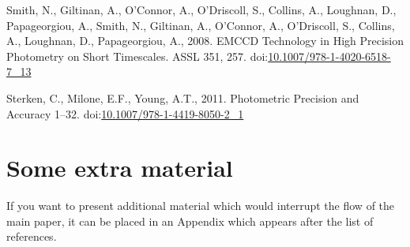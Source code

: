 \documentclass[]{elsarticle} %
\newlength{\cslhangindent}
\newlength{\cslentryspacingunit} %
\newenvironment{CSLReferences}[2] %
 {%
  \setlength{\parindent}{0pt}
  \ifodd #1
  \let\oldpar\par
  \def\par{\hangindent=\cslhangindent\oldpar}
  \fi
  \setlength{\parskip}{#2\cslentryspacingunit}
 }%
 {}
\begin{document}
\begin{CSLReferences}{1}{0}
\leavevmode{}%
Smith, N., Giltinan, A., O'Connor, A., O'Driscoll, S., Collins, A.,
Loughnan, D., Papageorgiou, A., Smith, N., Giltinan, A., O'Connor, A.,
O'Driscoll, S., Collins, A., Loughnan, D., Papageorgiou, A., 2008.
{EMCCD Technology in High Precision Photometry on Short Timescales}.
ASSL 351, 257.
doi:\href{https://doi.org/10.1007/978-1-4020-6518-7_13}{10.1007/978-1-4020-6518-7\_13}

\leavevmode{}%
Sterken, C., Milone, E.F., Young, A.T., 2011. {Photometric Precision and
Accuracy} 1--32.
doi:\href{https://doi.org/10.1007/978-1-4419-8050-2_1}{10.1007/978-1-4419-8050-2\_1}

\end{CSLReferences}

\appendix

\hypertarget{some-extra-material}{%
\section{Some extra material}\label{some-extra-material}}

If you want to present additional material which would interrupt the
flow of the main paper, it can be placed in an Appendix which appears
after the list of references.
\end{document}
